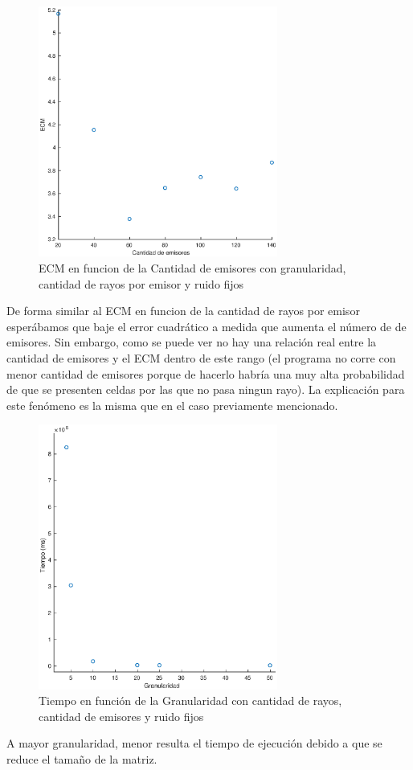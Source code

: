 \begin{figure}[H]
	\centering	\includegraphics[width=0.7\textwidth]{img/emi_ecm}
	\caption{ECM en funcion de la Cantidad de emisores con granularidad, cantidad de rayos por emisor y ruido fijos}
	\label{fig:emi_ecm}
\end{figure}
De forma similar al ECM en funcion de la cantidad de rayos por emisor esperábamos que baje el error cuadrático a medida que aumenta el número de de emisores. Sin embargo, como se puede ver no hay una relación real entre la cantidad de emisores y el ECM dentro de este rango (el programa no corre con menor cantidad de emisores porque de hacerlo habría una muy alta probabilidad de que se presenten celdas por las que no pasa ningun rayo). La explicación para este fenómeno es la misma que en el caso previamente mencionado.

\begin{figure}[H]
	\centering	\includegraphics[width=0.7\textwidth]{img/granu_tiempo}
	\caption{Tiempo en función de la Granularidad con cantidad de rayos, cantidad de emisores y ruido fijos}
	\label{fig:granu_tiempo}
\end{figure}
\par A mayor granularidad, menor resulta el tiempo de ejecuci\'on debido a que se reduce el tamaño de la matriz.

